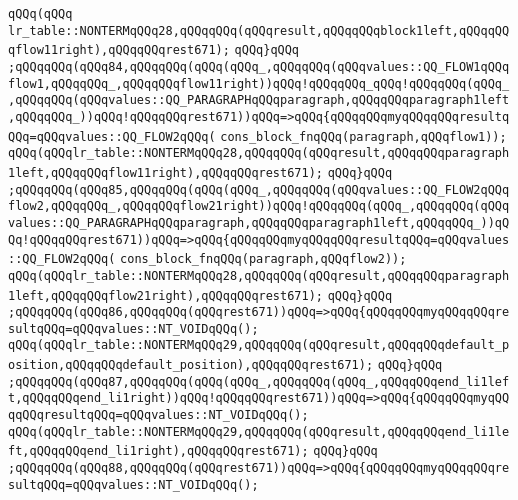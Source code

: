 \verb|qQQq(qQQq|\newline
\verb|lr_table::NONTERMqQQq28,qQQqqQQq(qQQqresult,qQQqqQQqblock1left,qQQqqQQqflow11right),qQQqqQQqrest671);|\newline
\verb|qQQq}qQQq|\newline
\verb|;qQQqqQQq(qQQq84,qQQqqQQq(qQQq(qQQq_,qQQqqQQq(qQQqvalues::QQ_FLOW1qQQqflow1,qQQqqQQq_,qQQqqQQqflow11right))qQQq!qQQqqQQq_qQQq!qQQqqQQq(qQQq_,qQQqqQQq(qQQqvalues::QQ_PARAGRAPHqQQqparagraph,qQQqqQQqparagraph1left,qQQqqQQq_))qQQq!qQQqqQQqrest671))qQQq=>qQQq{qQQqqQQqmyqQQqqQQqresultqQQq=qQQqvalues::QQ_FLOW2qQQq(|\newline
\verb|cons_block_fnqQQq(paragraph,qQQqflow1));|\newline
\verb|qQQq(qQQqlr_table::NONTERMqQQq28,qQQqqQQq(qQQqresult,qQQqqQQqparagraph1left,qQQqqQQqflow11right),qQQqqQQqrest671);|\newline
\verb|qQQq}qQQq|\newline
\verb|;qQQqqQQq(qQQq85,qQQqqQQq(qQQq(qQQq_,qQQqqQQq(qQQqvalues::QQ_FLOW2qQQqflow2,qQQqqQQq_,qQQqqQQqflow21right))qQQq!qQQqqQQq(qQQq_,qQQqqQQq(qQQqvalues::QQ_PARAGRAPHqQQqparagraph,qQQqqQQqparagraph1left,qQQqqQQq_))qQQq!qQQqqQQqrest671))qQQq=>qQQq{qQQqqQQqmyqQQqqQQqresultqQQq=qQQqvalues::QQ_FLOW2qQQq(|\newline
\verb|cons_block_fnqQQq(paragraph,qQQqflow2));|\newline
\verb|qQQq(qQQqlr_table::NONTERMqQQq28,qQQqqQQq(qQQqresult,qQQqqQQqparagraph1left,qQQqqQQqflow21right),qQQqqQQqrest671);|\newline
\verb|qQQq}qQQq|\newline
\verb|;qQQqqQQq(qQQq86,qQQqqQQq(qQQqrest671))qQQq=>qQQq{qQQqqQQqmyqQQqqQQqresultqQQq=qQQqvalues::NT_VOIDqQQq();|\newline
\verb|qQQq(qQQqlr_table::NONTERMqQQq29,qQQqqQQq(qQQqresult,qQQqqQQqdefault_position,qQQqqQQqdefault_position),qQQqqQQqrest671);|\newline
\verb|qQQq}qQQq|\newline
\verb|;qQQqqQQq(qQQq87,qQQqqQQq(qQQq(qQQq_,qQQqqQQq(qQQq_,qQQqqQQqend_li1left,qQQqqQQqend_li1right))qQQq!qQQqqQQqrest671))qQQq=>qQQq{qQQqqQQqmyqQQqqQQqresultqQQq=qQQqvalues::NT_VOIDqQQq();|\newline
\verb|qQQq(qQQqlr_table::NONTERMqQQq29,qQQqqQQq(qQQqresult,qQQqqQQqend_li1left,qQQqqQQqend_li1right),qQQqqQQqrest671);|\newline
\verb|qQQq}qQQq|\newline
\verb|;qQQqqQQq(qQQq88,qQQqqQQq(qQQqrest671))qQQq=>qQQq{qQQqqQQqmyqQQqqQQqresultqQQq=qQQqvalues::NT_VOIDqQQq();|\newline
